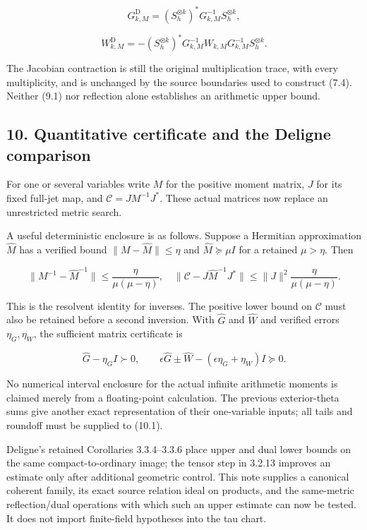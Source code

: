 \documentclass[
]{article}
\begin{document}
\[G_{k,M}^{\mathrm D}=(S_h^{\otimes k})^*G_{k,M}^{-1}S_h^{\otimes k},\]

\[W_{k,M}^{\mathrm D}=-(S_h^{\otimes k})^*G_{k,M}^{-1}W_{k,M}G_{k,M}^{-1}S_h^{\otimes k}.\tag{9.1}\]

The Jacobian contraction is still the original multiplication trace,
with every multiplicity, and is unchanged by the source boundaries used
to construct (7.4). Neither (9.1) nor reflection alone establishes an
arithmetic upper bound.

\subsection{10. Quantitative certificate and the Deligne
comparison}\label{quantitative-certificate-and-the-deligne-comparison}

For one or several variables write \(M\) for the positive moment matrix,
\(J\) for its fixed full-jet map, and \(\mathcal C=JM^{-1}J^*\). These
actual matrices now replace an unrestricted metric search.

A useful deterministic enclosure is as follows. Suppose a Hermitian
approximation \(\widehat M\) has a verified bound
\(\|M-\widehat M\|\le\eta\) and \(\widehat M\succeq\mu I\) for a
retained \(\mu>\eta\). Then

\[\|M^{-1}-\widehat M^{-1}\|\le\frac{\eta}{\mu(\mu-\eta)},\quad
\|\mathcal C-J\widehat M^{-1}J^*\|\le\|J\|^2\frac{\eta}{\mu(\mu-\eta)}.\tag{10.1}\]

This is the resolvent identity for inverses. The positive lower bound on
\(\mathcal C\) must also be retained before a second inversion. With
\(\widehat G\) and \(\widehat W\) and verified errors \(\eta_G,\eta_W\),
the sufficient matrix certificate is

\[\widehat G-\eta_GI\succ0,\qquad
\epsilon\widehat G\pm\widehat W-(\epsilon\eta_G+\eta_W)I\succeq0.\tag{10.2}\]

No numerical interval enclosure for the actual infinite arithmetic
moments is claimed merely from a floating-point calculation. The
previous exterior-theta sums give another exact representation of their
one-variable inputs; all tails and roundoff must be supplied to (10.1).

Deligne's retained Corollaries 3.3.4--3.3.6 place upper and dual lower
bounds on the same compact-to-ordinary image; the tensor step in 3.2.13
improves an estimate only after additional geometric control. This note
supplies a canonical coherent family, its exact source relation ideal on
products, and the same-metric reflection/dual operations with which such
an upper estimate can now be tested. It does not import finite-field
hypotheses into the tau chart.
\end{document}
